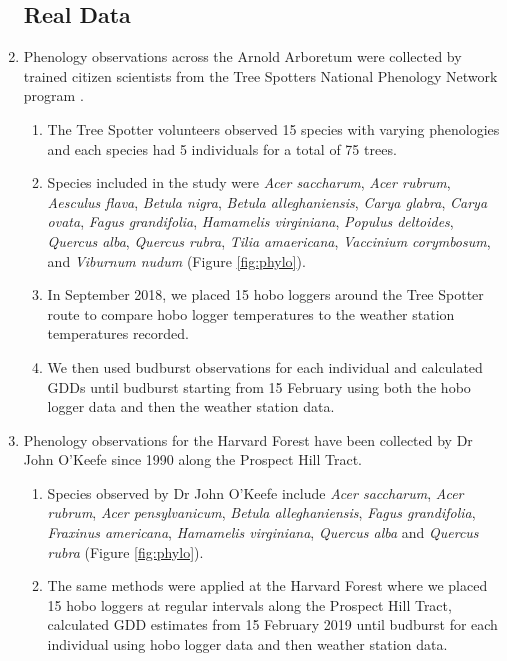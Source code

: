 \documentclass{article}\usepackage[]{graphicx}\usepackage[]{color}
\begin{document}
\begin{enumerate}
\subsection*{Real Data}
\item Phenology observations across the Arnold Arboretum were collected by trained citizen scientists from the Tree Spotters National Phenology Network program \citep{USA-NPN2016}. 
  \begin{enumerate}
  \item The Tree Spotter volunteers observed 15 species with varying phenologies and each species had 5 individuals for a total of 75 trees.
  \item Species included in the study were \textit{Acer saccharum}, \textit{Acer rubrum}, \textit{Aesculus flava}, \textit{Betula nigra}, \textit{Betula alleghaniensis}, \textit{Carya glabra}, \textit{Carya ovata}, \textit{Fagus grandifolia}, \textit{Hamamelis virginiana}, \textit{Populus deltoides}, \textit{Quercus alba}, \textit{Quercus rubra}, \textit{Tilia amaericana}, \textit{Vaccinium corymbosum}, and \textit{Viburnum nudum} (Figure \ref{fig:phylo}).  
  \item In September 2018, we placed 15 hobo loggers around the Tree Spotter route to compare hobo logger temperatures to the weather station temperatures recorded. 
  \item We then used budburst observations for each individual and calculated GDDs until budburst starting from 15 February using both the hobo logger data and then the weather station data. 
  \end{enumerate}
  
\item Phenology observations for the Harvard Forest have been collected by Dr John O'Keefe since 1990 \citep{OKeefe2014} along the Prospect Hill Tract. 
  \begin{enumerate}
  \item Species observed by Dr John O'Keefe include \textit{Acer saccharum}, \textit{Acer rubrum}, \textit{Acer pensylvanicum}, \textit{Betula alleghaniensis}, \textit{Fagus grandifolia}, \textit{Fraxinus americana}, \textit{Hamamelis virginiana}, \textit{Quercus alba} and \textit{Quercus rubra} (Figure \ref{fig:phylo}).
  \item The same methods were applied at the Harvard Forest where we placed 15 hobo loggers at regular intervals along the Prospect Hill Tract, calculated GDD estimates from 15 February 2019 until budburst for each individual using hobo logger data and then weather station data. 
  \end{enumerate}


\end{enumerate}
\end{document}
